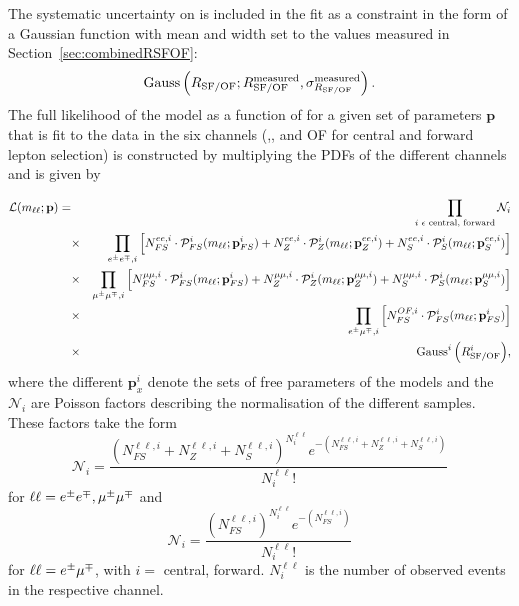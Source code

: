 The systematic uncertainty on \Rsfof is included in the fit as a constraint in the form of a Gaussian function with mean and width set to the values measured in Section~\ref{sec:combinedRSFOF}:
\begin{equation*}
\mathrm{Gauss}\left(R_{\text{SF/OF}};R_{\text{SF/OF}}^{\text{measured}},\sigma_{R_{\text{SF/OF}}}^{\text{measured}}\right).
\end{equation*}
The full likelihood of the model as a function of \mll for a given set of parameters $\mathbf{p}$ that is fit to the data in the six channels (\EE,\MM, and OF for central and forward lepton selection) is constructed by multiplying the PDFs of the different channels and is given by

\begin{eqnarray*}
{\mathcal{L}}(m_{\ell\ell};\mathbf{p}) =&&   \prod\limits_{i\text{ } \epsilon \text{ central, forward}} \mathcal{N}_i\\
                        &\times& \prod_{\EE,i}\left[N_{FS}^{ee,i} \cdot {\mathcal{P}}_{FS}^i(m_{\ell\ell};\mathbf{p}_{FS}^i) %
                                                  + N_{Z}^{ee,i} \cdot {\mathcal{P}}_{Z}^i(m_{\ell\ell};\mathbf{p}_{Z}^{ee,i}) %
                                                  + N_{S}^{ee,i} \cdot {\mathcal{P}}_{S}^i(m_{\ell\ell};\mathbf{p}_{S}^{ee,i})\right] \\
                        &\times& \prod_{\MM,i}\left[N_{FS}^{\mu\mu,i} \cdot {\mathcal{P}}_{FS}^i(m_{\ell\ell};\mathbf{p}_{FS}^i) %
                                                  + N_{Z}^{\mu\mu,i} \cdot {\mathcal{P}}_{Z}^i(m_{\ell\ell};\mathbf{p}_{Z}^{\mu\mu,i}) %
                                                  + N_{S}^{\mu\mu,i} \cdot {\mathcal{P}}_{S}^i(m_{\ell\ell};\mathbf{p}_{S}^{\mu\mu,i})\right] \\
                        &\times& \prod_{\EM,i}\left[N_{FS}^{OF,i} \cdot {\mathcal{P}}_{FS}^i(m_{\ell\ell};\mathbf{p}_{FS}^i)\right] \\   
                        &\times& {\mathrm{Gauss}^i\left(\Rsfof^i\right)}, \\
\end{eqnarray*}
where the different $\mathbf{p}^i_{x}$ denote the sets of free parameters of the models and the $\mathcal{N}_i$ are Poisson factors describing the normalisation of the different samples. These factors take the form
\begin{equation*}
\mathcal{N}_i = \frac{(N_{FS}^{\ell\ell,i} + N_{Z}^{\ell\ell,i} + N_{S}^{\ell\ell,i})^{N_i^{\ell\ell}} e^{-(N_{FS}^{\ell\ell,i} + N_{Z}^{\ell\ell,i} + N_{S}^{\ell\ell,i})}}{N_i^{\ell\ell}!}
\end{equation*} 
for $\ell\ell = e^\pm e^\mp, \mu^\pm\mu^\mp$ and
\begin{equation*}
\mathcal{N}_i = \frac{(N_{FS}^{\ell\ell,i})^{N_i^{\ell\ell}} e^{-(N_{FS}^{\ell\ell,i})}}{N_i^{\ell\ell}!}
\end{equation*}
for $\ell\ell = e^\pm\mu^\mp$, with $i =$ central, forward. $N_i^{\ell\ell}$ is the number of observed events in the respective channel. 

